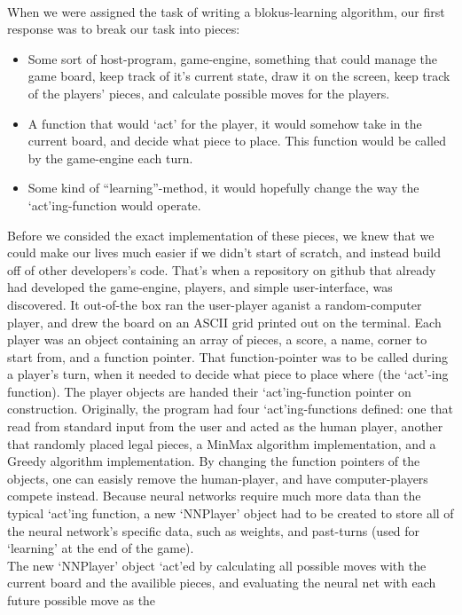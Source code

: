 \documentclass{report}
\begin{document}
	\\
		When we were assigned the task of writing a blokus-learning algorithm, our first response was to break our task into pieces:
		\begin{itemize}
			\item Some sort of host-program, game-engine, something that could manage the game board, keep track of it's current state, draw it on the screen, keep track of the players' pieces,
				and calculate possible moves for the players.
			\item A function that would `act' for the player, it would somehow take in the current board, and decide what piece to place. This function would be called by the game-engine each
				turn.
			\item Some kind of ``learning''-method, it would hopefully change the way the `act'ing-function would operate.
		\end{itemize}
		Before we consided the exact implementation of these pieces, we knew that we could make our lives much easier if we didn't start of scratch, and instead build off of other developers's code.
		That's when a repository on github that already had developed the game-engine, players, and simple user-interface, was discovered. It out-of-the box ran the user-player aganist a
		random-computer player, and drew the board on an ASCII grid printed out on the terminal. Each player was an object containing an array of pieces, a score, a name, corner to start from, and a
		function pointer. That function-pointer was to be called during a player's turn, when it needed	to decide what piece to place where (the `act'-ing function). The player objects are
		handed their `act'ing-function pointer on construction. Originally, the program had four `act'ing-functions defined: one that read from standard input from the user and acted as the
		human player, another that randomly placed legal pieces, a MinMax algorithm implementation, and a Greedy algorithm implementation. By changing the function pointers of the objects,
		one can easisly remove the human-player, and have computer-players compete instead. Because neural networks require much more data than the typical `act'ing function, a new `NNPlayer' object
		had to be created to store all of the neural network's specific data, such as weights, and past-turns (used for `learning' at the end of the game).\\
		The new `NNPlayer' object `act'ed by calculating all possible moves with the current board and the availible pieces, and evaluating the neural net with each future possible move as the
\end{document}
